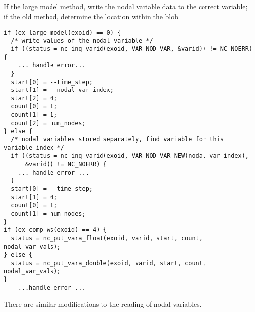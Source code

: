 \subsection{}
If the large model method, write the nodal variable data to the
correct variable; if the old method, determine the location within the
blob

\begin{lstlisting}
if (ex_large_model(exoid) == 0) {
  /* write values of the nodal variable */
  if ((status = nc_inq_varid(exoid, VAR_NOD_VAR, &varid)) != NC_NOERR) {
    ... handle error...
  }
  start[0] = --time_step;
  start[1] = --nodal_var_index;
  start[2] = 0;
  count[0] = 1;
  count[1] = 1;
  count[2] = num_nodes;
} else {
  /* nodal variables stored separately, find variable for this variable index */
  if ((status = nc_inq_varid(exoid, VAR_NOD_VAR_NEW(nodal_var_index),
      &varid)) != NC_NOERR) {
    ... handle error ...
  }
  start[0] = --time_step;
  start[1] = 0;
  count[0] = 1;
  count[1] = num_nodes;
}
if (ex_comp_ws(exoid) == 4) {
  status = nc_put_vara_float(exoid, varid, start, count, nodal_var_vals);
} else {
  status = nc_put_vara_double(exoid, varid, start, count, nodal_var_vals);
}
    ...handle error ...
\end{lstlisting}
There are similar modifications to the reading of nodal variables.
